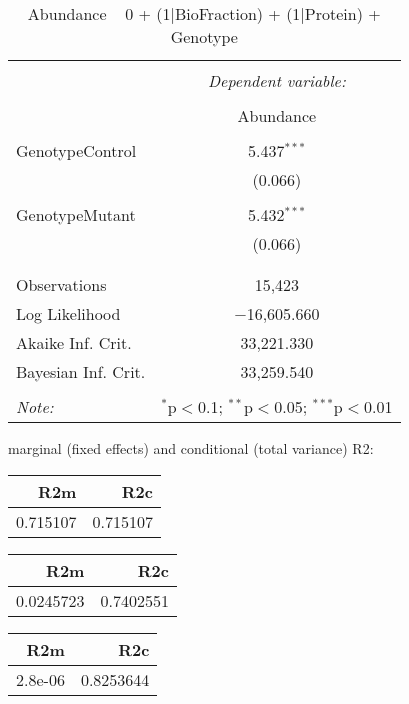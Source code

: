 \documentclass[11pt]{report}
\begin{document}
\begin{table}[!htbp] \centering 
  \caption{Abundance ~ 0 + (1|BioFraction) + (1|Protein) + Genotype} 
  \label{} 
\begin{tabular}{@{\extracolsep{5pt}}lc} 
\\[-1.8ex]\hline 
\hline \\[-1.8ex] 
 & \multicolumn{1}{c}{\textit{Dependent variable:}} \\ 
\cline{2-2} 
\\[-1.8ex] & Abundance \\ 
\hline \\[-1.8ex] 
 GenotypeControl & 5.437$^{***}$ \\ 
  & (0.066) \\ 
  & \\ 
 GenotypeMutant & 5.432$^{***}$ \\ 
  & (0.066) \\ 
  & \\ 
\hline \\[-1.8ex] 
Observations & 15,423 \\ 
Log Likelihood & $-$16,605.660 \\ 
Akaike Inf. Crit. & 33,221.330 \\ 
Bayesian Inf. Crit. & 33,259.540 \\ 
\hline 
\hline \\[-1.8ex] 
\textit{Note:}  & \multicolumn{1}{r}{$^{*}$p$<$0.1; $^{**}$p$<$0.05; $^{***}$p$<$0.01} \\ 
\end{tabular} 
\end{table} 
marginal (fixed effects) and conditional (total variance) R2:

\begin{tabular}{r|r}
\hline
R2m & R2c\\
\hline
0.715107 & 0.715107\\
\hline
\end{tabular}

\begin{tabular}{r|r}
\hline
R2m & R2c\\
\hline
0.0245723 & 0.7402551\\
\hline
\end{tabular}

\begin{tabular}{r|r}
\hline
R2m & R2c\\
\hline
2.8e-06 & 0.8253644\\
\hline
\end{tabular}
\end{document}
